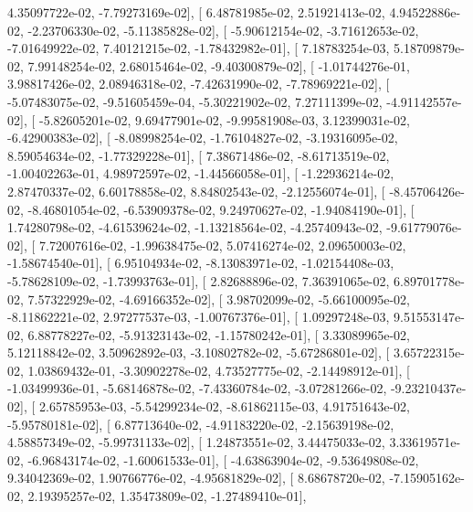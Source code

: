 \documentclass{article}
\begin{document}
          4.35097722e-02,  -7.79273169e-02],
       [  6.48781985e-02,   2.51921413e-02,   4.94522886e-02,
         -2.23706330e-02,  -5.11385828e-02],
       [ -5.90612154e-02,  -3.71612653e-02,  -7.01649922e-02,
          7.40121215e-02,  -1.78432982e-01],
       [  7.18783254e-03,   5.18709879e-02,   7.99148254e-02,
          2.68015464e-02,  -9.40300879e-02],
       [ -1.01744276e-01,   3.98817426e-02,   2.08946318e-02,
         -7.42631990e-02,  -7.78969221e-02],
       [ -5.07483075e-02,  -9.51605459e-04,  -5.30221902e-02,
          7.27111399e-02,  -4.91142557e-02],
       [ -5.82605201e-02,   9.69477901e-02,  -9.99581908e-03,
          3.12399031e-02,  -6.42900383e-02],
       [ -8.08998254e-02,  -1.76104827e-02,  -3.19316095e-02,
          8.59054634e-02,  -1.77329228e-01],
       [  7.38671486e-02,  -8.61713519e-02,  -1.00402263e-01,
          4.98972597e-02,  -1.44566058e-01],
       [ -1.22936214e-02,   2.87470337e-02,   6.60178858e-02,
          8.84802543e-02,  -2.12556074e-01],
       [ -8.45706426e-02,  -8.46801054e-02,  -6.53909378e-02,
          9.24970627e-02,  -1.94084190e-01],
       [  1.74280798e-02,  -4.61539624e-02,  -1.13218564e-02,
         -4.25740943e-02,  -9.61779076e-02],
       [  7.72007616e-02,  -1.99638475e-02,   5.07416274e-02,
          2.09650003e-02,  -1.58674540e-01],
       [  6.95104934e-02,  -8.13083971e-02,  -1.02154408e-03,
         -5.78628109e-02,  -1.73993763e-01],
       [  2.82688896e-02,   7.36391065e-02,   6.89701778e-02,
          7.57322929e-02,  -4.69166352e-02],
       [  3.98702099e-02,  -5.66100095e-02,  -8.11862221e-02,
          2.97277537e-03,  -1.00767376e-01],
       [  1.09297248e-03,   9.51553147e-02,   6.88778227e-02,
         -5.91323143e-02,  -1.15780242e-01],
       [  3.33089965e-02,   5.12118842e-02,   3.50962892e-03,
         -3.10802782e-02,  -5.67286801e-02],
       [  3.65722315e-02,   1.03869432e-01,  -3.30902278e-02,
          4.73527775e-02,  -2.14498912e-01],
       [ -1.03499936e-01,  -5.68146878e-02,  -7.43360784e-02,
         -3.07281266e-02,  -9.23210437e-02],
       [  2.65785953e-03,  -5.54299234e-02,  -8.61862115e-03,
          4.91751643e-02,  -5.95780181e-02],
       [  6.87713640e-02,  -4.91183220e-02,  -2.15639198e-02,
          4.58857349e-02,  -5.99731133e-02],
       [  1.24873551e-02,   3.44475033e-02,   3.33619571e-02,
         -6.96843174e-02,  -1.60061533e-01],
       [ -4.63863904e-02,  -9.53649808e-02,   9.34042369e-02,
          1.90766776e-02,  -4.95681829e-02],
       [  8.68678720e-02,  -7.15905162e-02,   2.19395257e-02,
          1.35473809e-02,  -1.27489410e-01],
\end{document}

